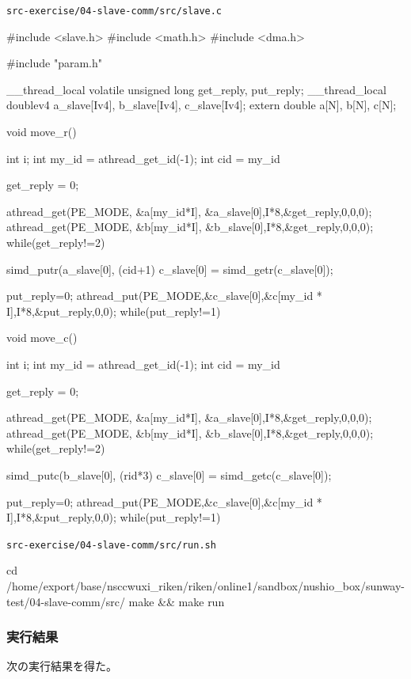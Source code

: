 \verb`src-exercise/04-slave-comm/src/slave.c`
\begin{code}
#include <slave.h>
#include <math.h>
#include <dma.h>

#include "param.h"

__thread_local volatile unsigned long get_reply, put_reply;
__thread_local doublev4 a_slave[Iv4], b_slave[Iv4], c_slave[Iv4];
extern double a[N], b[N], c[N];

void move_r() {
  int i;
  int my_id = athread_get_id(-1);
  int cid = my_id%

  get_reply = 0;

  athread_get(PE_MODE, &a[my_id*I], &a_slave[0],I*8,&get_reply,0,0,0);
  athread_get(PE_MODE, &b[my_id*I], &b_slave[0],I*8,&get_reply,0,0,0);
  while(get_reply!=2) {}

  simd_putr(a_slave[0], (cid+1)%
  c_slave[0] = simd_getr(c_slave[0]);

  put_reply=0;
  athread_put(PE_MODE,&c_slave[0],&c[my_id * I],I*8,&put_reply,0,0);
  while(put_reply!=1) {}

}

void move_c() {
  int i;
  int my_id = athread_get_id(-1);
  int cid = my_id%

  get_reply = 0;

  athread_get(PE_MODE, &a[my_id*I], &a_slave[0],I*8,&get_reply,0,0,0);
  athread_get(PE_MODE, &b[my_id*I], &b_slave[0],I*8,&get_reply,0,0,0);
  while(get_reply!=2) {}

  simd_putc(b_slave[0], (rid*3)%
  c_slave[0] = simd_getc(c_slave[0]);

  put_reply=0;
  athread_put(PE_MODE,&c_slave[0],&c[my_id * I],I*8,&put_reply,0,0);
  while(put_reply!=1) {}

}

\end{code}

\verb`src-exercise/04-slave-comm/src/run.sh`
\begin{code}

cd /home/export/base/nsccwuxi_riken/riken/online1/sandbox/nushio_box/sunway-test/04-slave-comm/src/
make && make run
    
\end{code}

\subsubsection{実行結果}

次の実行結果を得た。

